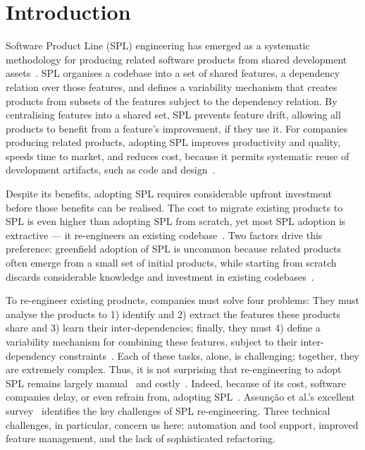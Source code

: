 \section{Introduction}
\label{sec:introduction}

Software Product Line (SPL) engineering has emerged as a systematic methodology for producing related software products from shared development assets~\cite{Pohl2005, Linden2007, Fischer2015}.
SPL organises a codebase into a set of shared features, a dependency relation over those features, and defines a variability mechanism that creates products from subsets of the features subject to the dependency relation.
By centralising features into a shared set, SPL prevents feature drift, allowing all products to benefit from a feature's improvement, if they use it.
For companies producing related products, adopting SPL improves productivity and quality, speeds time to market, and reduces cost, because it permits systematic reuse of development artifacts, such as code and design~\cite{Linden2007,Bastos2015}.

Despite its benefits, adopting SPL requires considerable upfront investment before those benefits can be realised. 
The cost to migrate existing products to SPL is even higher than adopting SPL from scratch, yet most SPL adoption is extractive --- it re-engineers an existing codebase~\cite{Krueger2001, Berger2013}. 
Two factors drive this preference: greenfield adoption of SPL is uncommon because related products often emerge from a small set of initial products, while starting from scratch discards considerable  knowledge and investment in existing codebases~\cite{Breivold2008,Northrop2012}.

To re-engineer existing products, companies must solve four problems:  They must analyse the products to 1) identify and 2) extract the features these products share and 3) learn their inter-dependencies; finally, they must 4) define a variability mechanism for combining these features, subject to their inter-dependency constraints~\cite{Assuncao2017}.
Each of these tasks, alone, is challenging; together, they are extremely complex.
Thus, it is not surprising that re-engineering to adopt SPL remains largely manual~\cite{Biggerstaff1993, Kastner2011, Lopez2011} and costly~\cite{Bockle2004}.
Indeed, because of its cost, software companies delay, or even refrain from, adopting SPL~\cite{Fischer2015}.
Assunção et al.'s excellent survey~\cite{Assuncao2017} identifies the key challenges of SPL re-engineering.  
Three technical challenges, in particular, concern us here:  automation and tool support,  improved feature management, and the lack of sophisticated refactoring.

